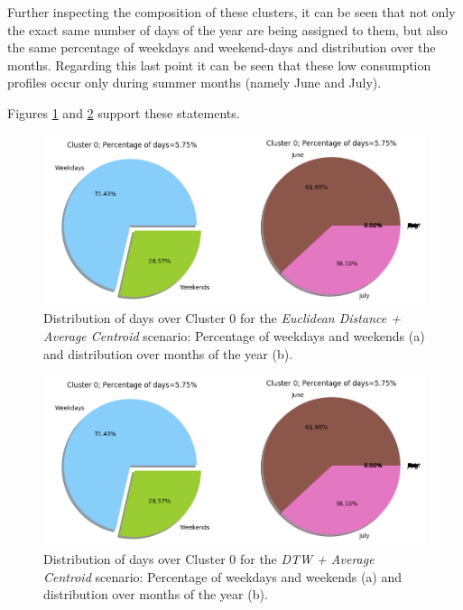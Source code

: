 \documentclass[9pt,journal,compsoc]{IEEEtran}
\begin{document}
Further inspecting the composition of these clusters, it can be seen that not only the exact same number of days of the year are being assigned to them, but also the same percentage of weekdays and weekend-days and distribution over the months. Regarding this last point it can be seen that these low consumption profiles occur only during summer months (namely June and July).

Figures \ref{distribution_euclidean_average_4clusters} and \ref{distribution_raw_average_4clusters} support these statements.

\begin{figure}
	\centering
	\includegraphics[scale=0.4]{images/percent_week_months_raw_average_4.png}
	\caption{Distribution of days over Cluster $0$ for the \emph{Euclidean Distance + Average Centroid} scenario: Percentage of weekdays and weekends (a) and distribution over months of the year (b).}
	\label{distribution_euclidean_average_4clusters}
\end{figure}

\begin{figure}
	\centering
	\includegraphics[scale=0.4]{images/percent_week_months_raw_average_4.png}
	\caption{Distribution of days over Cluster $0$ for the \emph{DTW + Average Centroid} scenario: Percentage of weekdays and weekends (a) and distribution over months of the year (b).}
	\label{distribution_raw_average_4clusters}
\end{figure}
\end{document}
